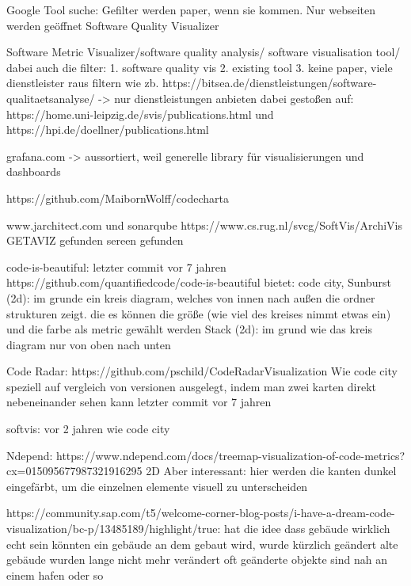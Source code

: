 Google Tool suche:
Gefilter werden paper, wenn sie kommen. Nur webseiten werden geöffnet
Software Quality Visualizer


Software Metric Visualizer/software quality analysis/ software visualisation tool/ 
dabei auch die filter: 1. software quality vis 2. existing tool 3. keine paper, 
viele dienstleister raus filtern wie zb. https://bitsea.de/dienstleistungen/software-qualitaetsanalyse/ -> nur dienstleistungen anbieten
dabei gestoßen auf: https://home.uni-leipzig.de/svis/publications.html und https://hpi.de/doellner/publications.html


grafana.com -> aussortiert, weil generelle library für visualisierungen und dashboards


https://github.com/MaibornWolff/codecharta

www.jarchitect.com und sonarqube
https://www.cs.rug.nl/svcg/SoftVis/ArchiVis
GETAVIZ gefunden
sereen gefunden

code-is-beautiful: letzter commit vor 7 jahren
https://github.com/quantifiedcode/code-is-beautiful
bietet: code city, 
Sunburst (2d): im grunde ein kreis diagram, welches von  innen nach außen die ordner strukturen zeigt. die es können die größe (wie viel des kreises nimmt etwas ein) und die farbe als metric gewählt werden
Stack (2d): im grund wie das kreis diagram nur von oben nach unten


Code Radar:
https://github.com/pschild/CodeRadarVisualization
Wie code city speziell auf vergleich von versionen ausgelegt, indem man zwei karten direkt nebeneinander sehen kann
letzter commit vor 7 jahren


softvis:
vor 2 jahren
wie code city


Ndepend:
https://www.ndepend.com/docs/treemap-visualization-of-code-metrics?cx=015095677987321916295%
2D
Aber interessant: hier werden die kanten dunkel eingefärbt, um die einzelnen elemente visuell zu unterscheiden


https://community.sap.com/t5/welcome-corner-blog-posts/i-have-a-dream-code-visualization/bc-p/13485189/highlight/true:
hat die idee dass gebäude wirklich echt sein könnten
ein gebäude an dem gebaut wird, wurde kürzlich geändert
alte gebäude wurden lange nicht mehr verändert
oft geänderte objekte sind nah an einem hafen oder so


